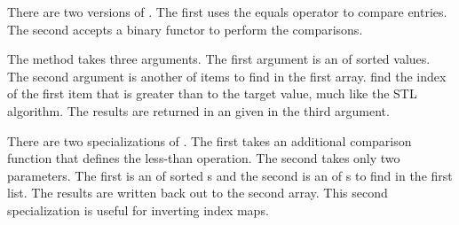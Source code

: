 \begin{description}
  There are two versions of . The first uses the equals
  operator to compare entries. The second accepts a binary functor to
  perform the comparisons.
\item[\textcode{UpperBounds}]  The
   method takes three arguments. The first argument
  is an  of sorted values. The second argument
  is another  of items to find in the first
  array.  find the index of the first item that is
  greater than to the target value, much like the
   STL algorithm. The results are returned in
  an  given in the third argument.

  There are two specializations of . The first takes
  an additional comparison function that defines the less-than
  operation. The second takes only two parameters. The first is an
   of sorted s and the second is an
   of s to find in the first list. The
  results are written back out to the second array. This second
  specialization is useful for inverting index maps.
\end{description}



